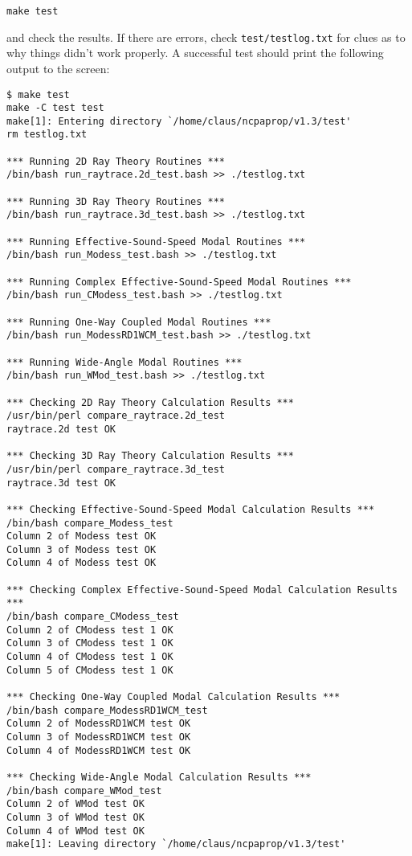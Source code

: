 \texttt{make test}

\noindent
and check the results.  If there are errors, check \texttt{test/testlog.txt} for clues as to why things didn't work properly.  A successful test should print the following output to the screen:

\begin{verbatim}
$ make test
make -C test test
make[1]: Entering directory `/home/claus/ncpaprop/v1.3/test'
rm testlog.txt

*** Running 2D Ray Theory Routines ***
/bin/bash run_raytrace.2d_test.bash >> ./testlog.txt

*** Running 3D Ray Theory Routines ***
/bin/bash run_raytrace.3d_test.bash >> ./testlog.txt

*** Running Effective-Sound-Speed Modal Routines ***
/bin/bash run_Modess_test.bash >> ./testlog.txt 

*** Running Complex Effective-Sound-Speed Modal Routines ***
/bin/bash run_CModess_test.bash >> ./testlog.txt 

*** Running One-Way Coupled Modal Routines ***
/bin/bash run_ModessRD1WCM_test.bash >> ./testlog.txt 

*** Running Wide-Angle Modal Routines ***
/bin/bash run_WMod_test.bash >> ./testlog.txt 

*** Checking 2D Ray Theory Calculation Results ***
/usr/bin/perl compare_raytrace.2d_test
raytrace.2d test OK

*** Checking 3D Ray Theory Calculation Results ***
/usr/bin/perl compare_raytrace.3d_test
raytrace.3d test OK

*** Checking Effective-Sound-Speed Modal Calculation Results ***
/bin/bash compare_Modess_test
Column 2 of Modess test OK
Column 3 of Modess test OK
Column 4 of Modess test OK

*** Checking Complex Effective-Sound-Speed Modal Calculation Results ***
/bin/bash compare_CModess_test
Column 2 of CModess test 1 OK
Column 3 of CModess test 1 OK
Column 4 of CModess test 1 OK
Column 5 of CModess test 1 OK

*** Checking One-Way Coupled Modal Calculation Results ***
/bin/bash compare_ModessRD1WCM_test
Column 2 of ModessRD1WCM test OK
Column 3 of ModessRD1WCM test OK
Column 4 of ModessRD1WCM test OK

*** Checking Wide-Angle Modal Calculation Results ***
/bin/bash compare_WMod_test
Column 2 of WMod test OK
Column 3 of WMod test OK
Column 4 of WMod test OK
make[1]: Leaving directory `/home/claus/ncpaprop/v1.3/test'
\end{verbatim}

